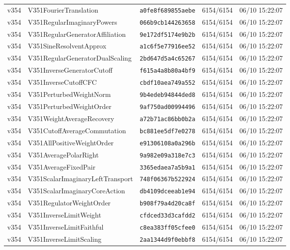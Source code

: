 \documentclass[11pt]{article}
\theoremstyle{definition}\newtheorem{deriv}{Derivation}
\begin{document}
{\begin{longtable}{@{}lllll@{}}
v354 & V351FourierTranslation & \texttt{a0fe8f689855aebe} & 6154/6154 & 06/10 15:22:07 \\
v354 & V351RegularImaginaryPowers & \texttt{066b9cb144263658} & 6154/6154 & 06/10 15:22:07 \\
v354 & V351RegularGeneratorAffiliation & \texttt{9e172df5174e9b2b} & 6154/6154 & 06/10 15:22:07 \\
v354 & V351SineResolventApprox & \texttt{a1c6f5e77916ee52} & 6154/6154 & 06/10 15:22:07 \\
v354 & V351RegularGeneratorDualScaling & \texttt{2bd647d5a4c65267} & 6154/6154 & 06/10 15:22:07 \\
v354 & V351InverseGeneratorCutoff & \texttt{f615a4a8b80a4bf9} & 6154/6154 & 06/10 15:22:07 \\
v354 & V351InverseCutoffCFC & \texttt{cbdf10aea749a552} & 6154/6154 & 06/10 15:22:07 \\
v354 & V351PerturbedWeightNorm & \texttt{9b4edeb94844ded8} & 6154/6154 & 06/10 15:22:07 \\
v354 & V351PerturbedWeightOrder & \texttt{9af750ad00994496} & 6154/6154 & 06/10 15:22:07 \\
v354 & V351WeightAverageRecovery & \texttt{a72b71ac86bb0b2a} & 6154/6154 & 06/10 15:22:07 \\
v354 & V351CutoffAverageCommutation & \texttt{bc881ee5df7e0278} & 6154/6154 & 06/10 15:22:07 \\
v354 & V351AllPositiveWeightOrder & \texttt{e91306108a0a296b} & 6154/6154 & 06/10 15:22:07 \\
v354 & V351AveragePolarRight & \texttt{9a982e09a318e7c3} & 6154/6154 & 06/10 15:22:07 \\
v354 & V351AverageFixedPair & \texttt{3365edaea7a5b9a1} & 6154/6154 & 06/10 15:22:07 \\
v354 & V351ScalarImaginaryLeftTransport & \texttt{748f06367b522924} & 6154/6154 & 06/10 15:22:07 \\
v354 & V351ScalarImaginaryCoreAction & \texttt{db4109dceeab1e94} & 6154/6154 & 06/10 15:22:07 \\
v354 & V351RegulatorWeightOrder & \texttt{b908f79a4d20ca8f} & 6154/6154 & 06/10 15:22:07 \\
v354 & V351InverseLimitWeight & \texttt{cfdced33d3cafdd2} & 6154/6154 & 06/10 15:22:07 \\
v354 & V351InverseLimitFaithful & \texttt{c8ea383ff05cfee0} & 6154/6154 & 06/10 15:22:07 \\
v354 & V351InverseLimitScaling & \texttt{2aa1344d9f0ebbf8} & 6154/6154 & 06/10 15:22:07 \\

\end{longtable}}
\end{document}
